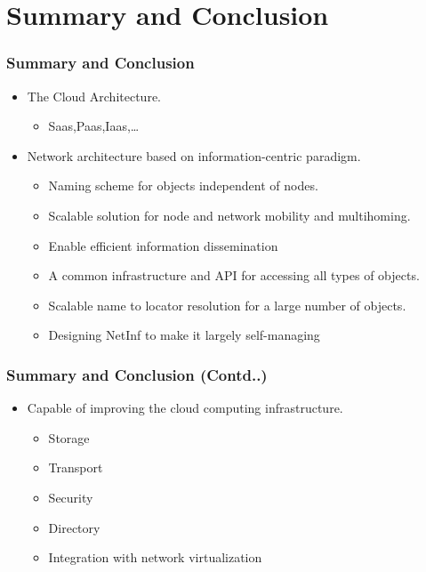 \documentclass [12pt] {beamer}
\begin{document}
\section{Summary and Conclusion}
 \begin{frame}
  \frametitle{Summary and Conclusion}
  \begin{itemize}
   \item The Cloud Architecture.
	  \begin{itemize}
	   \item Saas,Paas,Iaas,\dots
	  \end{itemize}

   \item Network architecture based on information-centric paradigm.
	  \begin{itemize}
	   \item Naming scheme for objects independent of nodes.
	   \item Scalable solution for node and network mobility and multihoming.
	   \item Enable efficient information dissemination
	   \item A common infrastructure and API for accessing all types of objects.
	   \item Scalable name to locator resolution for a large number of objects.
	   \item Designing NetInf to make it largely self-managing
	  \end{itemize}
\end{itemize}
\end{frame}

\begin{frame}
\frametitle{Summary and Conclusion (Contd..)}
\begin{itemize}
    \item Capable of improving the cloud computing infrastructure.
	  \begin{itemize}
	   \item Storage
	   \item Transport
	   \item Security
	   \item Directory
	   \item Integration with network virtualization
	  \end{itemize}

  \end{itemize}
\end{frame}
\end{document}
